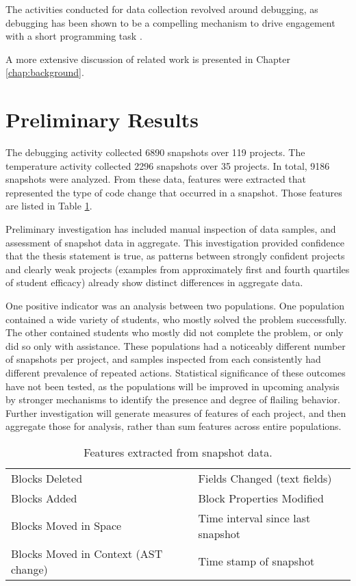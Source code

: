 The activities conducted for data collection revolved around debugging, as debugging has been shown to be a compelling mechanism to drive engagement with a short programming task \citep{webb2010troubleshooting}.

A more extensive discussion of related work is presented in Chapter \ref{chap:background}.

\section{Preliminary Results} %
\label{chap:analysis}
The debugging activity collected 6890 snapshots over 119 projects. The temperature activity collected 2296 snapshots over 35 projects. In total, 9186 snapshots were analyzed. From these data, features were extracted that represented the type of code change that occurred in a snapshot. Those features are listed in Table \ref{tab:features-extracted}. 

Preliminary investigation has included manual inspection of data samples, and assessment of snapshot data in aggregate. This investigation provided confidence that the thesis statement is true, as patterns between strongly confident projects and clearly weak projects (examples from approximately first and fourth quartiles of student efficacy) already show distinct differences in aggregate data. 

One positive indicator was an analysis between two populations. One population contained a wide variety of students, who mostly solved the problem successfully. The other contained students who mostly did not complete the problem, or only did so only with assistance. These populations had a noticeably different number of snapshots per project, and samples inspected from each consistently had different prevalence of repeated actions. Statistical significance of these outcomes have not been tested, as the populations will be improved in upcoming analysis by stronger mechanisms to identify the presence and degree of flailing behavior. Further investigation will generate measures of features of each project, and then aggregate those for analysis, rather than sum features across entire populations.

\begin{table}
\begin{centering}
	\begin{tabular}{l l}
	
	Blocks Deleted 							& Fields Changed (text fields)		\\
	Blocks Added 							& Block Properties Modified			\\
	Blocks Moved in Space 					& Time interval since last snapshot	\\
	Blocks Moved in Context (AST change)	& Time stamp of snapshot			\\

	\end{tabular}
	\caption[Features extracted from snapshots]{Features extracted from snapshot data.}
	\label{tab:features-extracted}
\end{centering}
\end{table}

